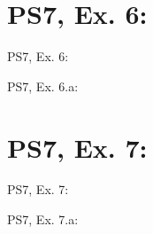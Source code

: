 \section{PS7, Ex. 6: }

\begin{frame}{PS7, Ex. 6: }
  \begin{multicols}{2}
    \vfill\null\columnbreak
    \vfill\null
  \end{multicols}
\end{frame}

\begin{frame}{PS7, Ex. 6.a: }
  \begin{multicols}{2}
    \vfill\null\columnbreak
    \vfill\null
  \end{multicols}
\end{frame}



\section{PS7, Ex. 7: }

\begin{frame}{PS7, Ex. 7: }
  \begin{multicols}{2}
    \vfill\null\columnbreak
    \vfill\null
  \end{multicols}
\end{frame}

\begin{frame}{PS7, Ex. 7.a: }
  \begin{multicols}{2}
    \vfill\null\columnbreak
    \vfill\null
  \end{multicols}
\end{frame}
